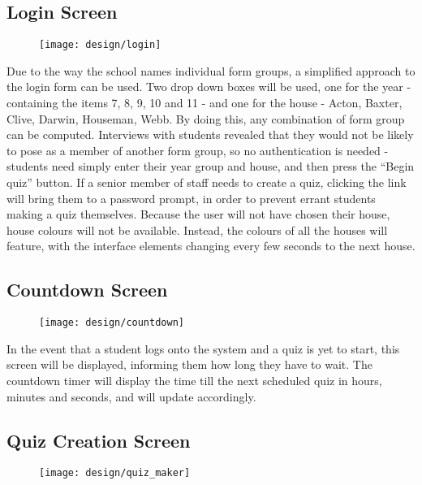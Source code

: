 \subsection{Login Screen}
\begin{figure}[h!]
  \texttt{[image: design/login]}
\end{figure}

Due to the way the school names individual form groups, a simplified approach to the login form can be used. Two drop down boxes will be used, one for the year - containing the items 7, 8, 9, 10 and 11 - and one for the house - Acton, Baxter, Clive, Darwin, Houseman, Webb. By doing this, any combination of form group can be computed. Interviews with students revealed that they would not be likely to pose as a member of another form group, so no authentication is needed - students need simply enter their year group and house, and then press the ``Begin quiz'' button. If a senior member of staff needs to create a quiz, clicking the link will bring them to a password prompt, in order to prevent errant students making a quiz themselves. Because the user will not have chosen their house, house colours will not be available. Instead, the colours of all the houses will feature, with the interface elements changing every few seconds to the next house.

\clearpage

\subsection{Countdown Screen}
\begin{figure}[h!]
  \texttt{[image: design/countdown]}
\end{figure}

In the event that a student logs onto the system and a quiz is yet to start, this screen will be displayed, informing them how long they have to wait. The countdown timer will display the time till the next scheduled quiz in hours, minutes and seconds, and will update accordingly.

\clearpage

\subsection{Quiz Creation Screen}
\begin{figure}[h!]
  \texttt{[image: design/quiz\_maker]}
\end{figure}


